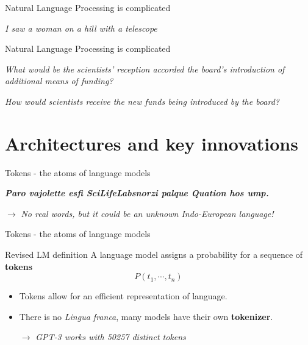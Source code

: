 \documentclass[10pt]{beamer}
\newcommand{\feature}[1]{{\color{scLime} \textbf{#1}}}
\newcommand{\remark}[1]{{\par \color{scGrape} \ensuremath{\rightarrow} \emph{#1}}}
\begin{document}
\begin{frame}[standout]{Natural Language Processing is complicated}
	\begin{center}
			\emph{I saw a woman on a hill with a telescope}
	\end{center}
\end{frame}

\begin{frame}[standout]{Natural Language Processing is complicated}
	\begin{center}
		\emph{What would be the scientists' reception accorded the board's introduction of additional means of funding?}
		\vspace{2cm}\par
		\emph{How would scientists receive the new funds being introduced by the board?}
	\end{center}
\end{frame}


\section{Architectures and key innovations}


\begin{frame}{Tokens - the atoms of language models}
	\begin{center}
		\emph{\large \bfseries Paro vajolette esfi SciLifeLab\linebreak snorzi palque Quation hos ump.}
	\end{center}
  \remark{No real words, but it could be an unknown Indo-European language!}
\end{frame}

\begin{frame}{Tokens - the atoms of language models}
\begin{exampleblock}{Revised LM definition}
	A language model assigns a probability for a sequence of \feature{tokens}
	$$
	P(t_1, \cdots, t_{n})
	$$
\end{exampleblock}
\begin{itemize}
	\item Tokens allow for an efficient representation of language.
	\item There is no \emph{Lingua franca}, many models have their own \feature{tokenizer}. 
	 \par \remark{GPT-3 works with 50257 distinct tokens}
\end{itemize}
\end{frame}
\end{document}
